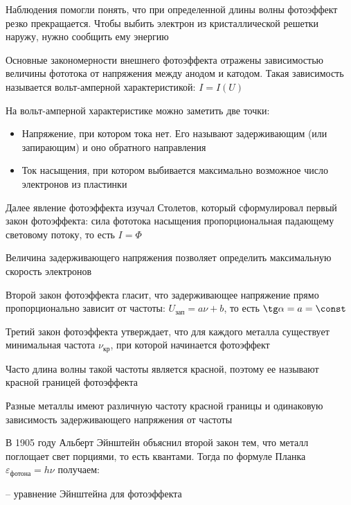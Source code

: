 \documentclass[12pt]{article}
\begin{document}
Наблюдения помогли понять, что при определенной длины волны фотоэффект резко прекращается. Чтобы выбить электрон из кристаллической решетки наружу, нужно сообщить ему энергию

Основные закономерности внешнего фотоэффекта отражены зависимостью величины фототока от напряжения между анодом и катодом. Такая зависимость называется вольт-амперной характеристикой: $I = I(U)$


На вольт-амперной характеристике можно заметить две точки:

\begin{itemize}
    \item Напряжение, при котором тока нет. Его называют задерживающим (или запирающим) и оно обратного направления
    \item Ток насыщения, при котором выбивается максимально возможное число электронов из пластинки
\end{itemize}

\mediumvspace

Далее явление фотоэффекта изучал Столетов, который сформулировал первый закон фотоэффекта: сила фототока насыщения пропорциональная падающему световому потоку, то есть $I = \Phi$

Величина задерживающего напряжения позволяет определить максимальную скорость электронов

Второй закон фотоэффекта гласит, что задерживающее напряжение прямо пропорционально зависит от частоты: $U_\text{зап} = a\nu + b$, то есть $\tg \alpha = a = \const$

Третий закон фотоэффекта утверждает, что для каждого металла существует минимальная частота $\nu_{\text{кр}}$, при которой начинается фотоэффект

Часто длина волны такой частоты является красной, поэтому ее называют красной границей фотоэффекта

Разные металлы имеют различную частоту красной границы и одинаковую зависимость задерживающего напряжения от частоты

\mediumvspace

В 1905 году Альберт Эйнштейн объяснил второй закон тем, что металл поглощает свет порциями, то есть квантами. Тогда по формуле Планка $\varepsilon_{\text{фотона}} = h \nu$ получаем:

 -- уравнение Эйнштейна для фотоэффекта
\end{document}
